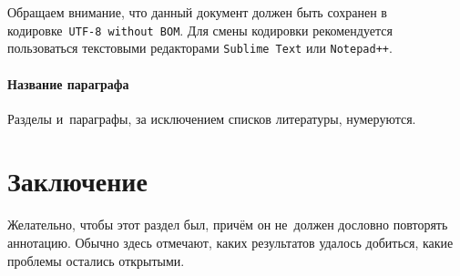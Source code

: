 \documentclass[12pt, twoside]{article}
\begin{document}
Обращаем внимание, что данный документ должен быть сохранен в кодировке~\verb'UTF-8 without BOM'.
Для смены кодировки рекомендуется пользоваться текстовыми редакторами \verb'Sublime Text' или \verb'Notepad++'.

\paragraph{Название параграфа}
Разделы и~параграфы, за исключением списков литературы, нумеруются.

\section{Заключение}
Желательно, чтобы этот раздел был, причём он не~должен дословно повторять аннотацию.
Обычно здесь отмечают, каких результатов удалось добиться, какие проблемы остались открытыми.



\end{document}
